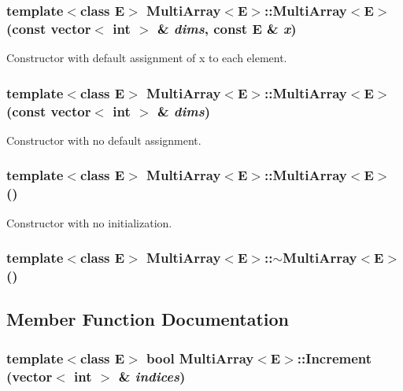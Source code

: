 \subsubsection{\setlength{\rightskip}{0pt plus 5cm}template$<$class E$>$ Multi\-Array$<$E$>$::Multi\-Array$<$E$>$ (const vector$<$ int $>$ \& {\em dims}, const E \& {\em x})}\label{classMultiArray_a0}


Constructor with default assignment of x to each element.

\subsubsection{\setlength{\rightskip}{0pt plus 5cm}template$<$class E$>$ Multi\-Array$<$E$>$::Multi\-Array$<$E$>$ (const vector$<$ int $>$ \& {\em dims})}\label{classMultiArray_a1}


Constructor with no default assignment.

\subsubsection{\setlength{\rightskip}{0pt plus 5cm}template$<$class E$>$ Multi\-Array$<$E$>$::Multi\-Array$<$E$>$ ()\hspace{0.3cm}{\tt  [inline]}}\label{classMultiArray_a2}


Constructor with no initialization.

\subsubsection{\setlength{\rightskip}{0pt plus 5cm}template$<$class E$>$ Multi\-Array$<$E$>$::$\sim$Multi\-Array$<$E$>$ ()\hspace{0.3cm}{\tt  [inline]}}\label{classMultiArray_a3}




\subsection{Member Function Documentation}
\subsubsection{\setlength{\rightskip}{0pt plus 5cm}template$<$class E$>$ bool Multi\-Array$<$E$>$::Increment (vector$<$ int $>$ \& {\em indices})\hspace{0.3cm}{\tt  [inline]}}\label{classMultiArray_a5}


